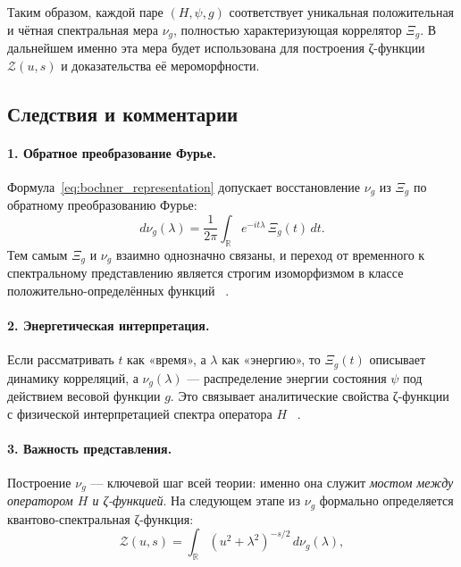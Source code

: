 \documentclass{article}
\numberwithin{equation}{section}
\theoremstyle{plain}
\theoremstyle{definition}
\theoremstyle{remark}
\begin{document}
\noindent
Таким образом, каждой паре $(H,\psi,g)$ соответствует уникальная положительная и чётная спектральная мера $\nu_g$, полностью характеризующая коррелятор $\Xi_g$.  
В дальнейшем именно эта мера будет использована для построения ζ-функции $\mathcal Z(u,s)$ и доказательства её мероморфности.

\subsection{Следствия и комментарии}
\label{subsec:remarks}

\paragraph{1. Обратное преобразование Фурье.}
Формула~\eqref{eq:bochner_representation} допускает восстановление $\nu_g$ из $\Xi_g$ по обратному преобразованию Фурье:
\begin{equation}
d\nu_g(\lambda)
=\frac{1}{2\pi}\int_{\mathbb R} e^{-it\lambda}\,\Xi_g(t)\,dt.
\end{equation}
Тем самым $\Xi_g$ и $\nu_g$ взаимно однозначно связаны, и переход от временного к спектральному представлению является строгим изоморфизмом в классе положительно-определённых функций ~\cite{Hormander1983}.

\paragraph{2. Энергетическая интерпретация.}
Если рассматривать $t$ как «время», а $\lambda$ как «энергию», то $\Xi_g(t)$ описывает динамику корреляций, а $\nu_g(\lambda)$ — распределение энергии состояния $\psi$ под действием весовой функции $g$.  
Это связывает аналитические свойства ζ-функции с физической интерпретацией спектра оператора $H$ ~\cite{Haake2010}.

\paragraph{3. Важность представления.}
Построение $\nu_g$ — ключевой шаг всей теории:  
именно она служит \emph{мостом между оператором $H$ и ζ-функцией}.  
На следующем этапе из $\nu_g$ формально определяется квантово-спектральная ζ-функция:
\begin{equation}
\mathcal Z(u,s)
=\int_{\mathbb R}(u^2+\lambda^2)^{-s/2}\,d\nu_g(\lambda),
\label{eq:QSSC0015}
\end{equation}
\end{document}
